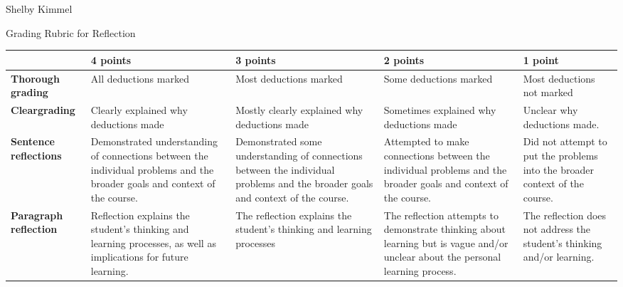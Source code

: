 \documentclass[12pt,landscape]{article}
\begin{document}
\hfill Shelby Kimmel

\begin{center}
{\huge Grading Rubric for Reflection}
\end{center}



{\renewcommand{\arraystretch}{2}
\begin{tabular}{|p{2.3cm}|p{4.2cm}|p{4.2cm}|p{4.2cm}|p{4.2cm}|}
\hline
 & {\bf 4 points} & {\bf 3 points} & {\bf 2 points} & {\bf 1 point} \\
\hline
{\bf Thorough grading }& 
 All deductions marked & 
 Most deductions marked& 
 Some deductions marked & 
 Most deductions not marked\\
\hline
{\bf Clear\newline grading }& 
Clearly explained why deductions made & 
Mostly clearly explained why deductions made & 
Sometimes explained why deductions made & 
Unclear why deductions made.\\
\hline
{\bf Sentence \newline reflections} &
Demonstrated understanding of connections between the individual problems and the broader goals and context of the course.
&
Demonstrated some understanding of connections between the individual problems and the broader goals and context of the course.
&
Attempted to make connections between the individual problems and the broader goals and context of the course.
&
Did not attempt to put the problems into the broader context of the course.
\\
\hline
{\bf Paragraph reflection}&
Reflection explains the student's thinking and learning processes, as well as implications for future learning.& 
The reflection explains the student's thinking and learning processes&
The reflection attempts to demonstrate thinking about learning but is vague and/or unclear about the personal learning process.&
The reflection does not address the student's thinking and/or learning.\\
\hline
 \end{tabular}
}
\end{document}
